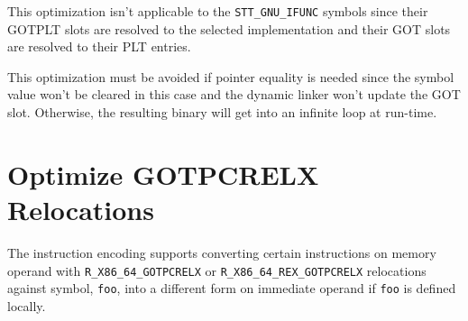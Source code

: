 This optimization isn't applicable to the \texttt{STT_GNU_IFUNC} symbols
since their GOTPLT slots are resolved to the selected implementation and
their GOT slots are resolved to their PLT entries.

This optimization must be avoided if pointer equality is needed since
the symbol value won't be cleared in this case and the dynamic linker
won't update the GOT slot.  Otherwise, the resulting binary will get
into an infinite loop at run-time.

\section{Optimize GOTPCRELX Relocations}

The \xARCH instruction encoding supports converting certain instructions
on memory operand with \texttt{R_X86_64_GOTPCRELX} or
\texttt{R_X86_64_REX_GOTPCRELX} relocations against symbol, \texttt{foo},
into a different form on immediate operand if \texttt{foo} is defined
locally.

